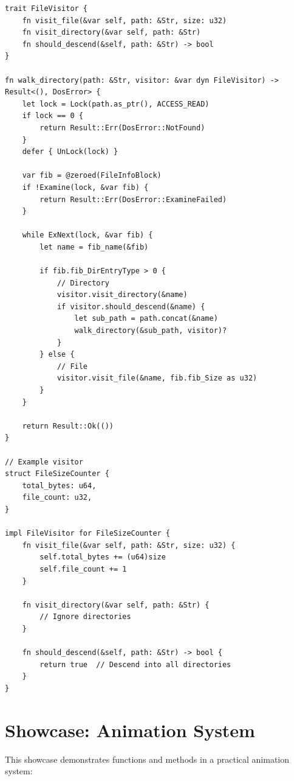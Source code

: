 \begin{lstlisting}
trait FileVisitor {
    fn visit_file(&var self, path: &Str, size: u32)
    fn visit_directory(&var self, path: &Str)
    fn should_descend(&self, path: &Str) -> bool
}

fn walk_directory(path: &Str, visitor: &var dyn FileVisitor) -> Result<(), DosError> {
    let lock = Lock(path.as_ptr(), ACCESS_READ)
    if lock == 0 {
        return Result::Err(DosError::NotFound)
    }
    defer { UnLock(lock) }

    var fib = @zeroed(FileInfoBlock)
    if !Examine(lock, &var fib) {
        return Result::Err(DosError::ExamineFailed)
    }

    while ExNext(lock, &var fib) {
        let name = fib_name(&fib)

        if fib.fib_DirEntryType > 0 {
            // Directory
            visitor.visit_directory(&name)
            if visitor.should_descend(&name) {
                let sub_path = path.concat(&name)
                walk_directory(&sub_path, visitor)?
            }
        } else {
            // File
            visitor.visit_file(&name, fib.fib_Size as u32)
        }
    }

    return Result::Ok(())
}

// Example visitor
struct FileSizeCounter {
    total_bytes: u64,
    file_count: u32,
}

impl FileVisitor for FileSizeCounter {
    fn visit_file(&var self, path: &Str, size: u32) {
        self.total_bytes += (u64)size
        self.file_count += 1
    }

    fn visit_directory(&var self, path: &Str) {
        // Ignore directories
    }

    fn should_descend(&self, path: &Str) -> bool {
        return true  // Descend into all directories
    }
}
\end{lstlisting}

\section{Showcase: Animation System}

This showcase demonstrates functions and methods in a practical animation system:

